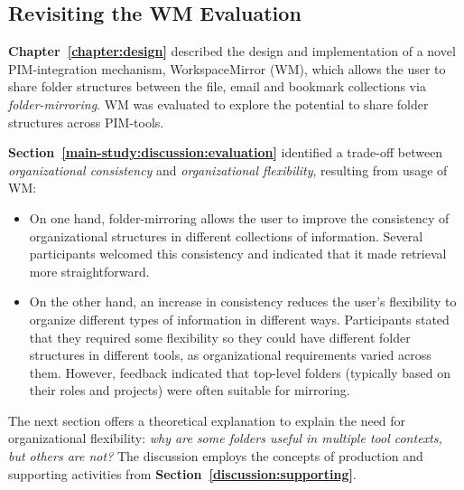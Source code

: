 \subsection{Revisiting the WM Evaluation}
\label{disc:design-guidelines-discussion-pim-integration}

\textbf{Chapter~\ref{chapter:design}} described the design and implementation of a novel PIM-integration mechanism, WorkspaceMirror (WM), which allows the user to share folder structures between the file, email and bookmark collections via \textit{folder-mirroring}. 
WM was evaluated to explore the potential to share folder structures across PIM-tools. 

\textbf{Section~\ref{main-study:discussion:evaluation}} identified a trade-off between \textit{organizational consistency} and \textit{organizational flexibility}, resulting from usage of WM:

\begin{itemize}

\item On one hand, folder-mirroring allows the user to improve the consistency of organizational structures in different collections of information.  Several participants welcomed this consistency and indicated that it made retrieval more straightforward.

\item On the other hand, an increase in consistency reduces the user's flexibility to organize different types of information in different ways.  Participants stated that they required some flexibility so they could have different folder structures in different tools, as organizational requirements varied across them.  However, feedback indicated that top-level folders (typically based on their roles and projects) were often suitable for mirroring.  

\end{itemize}

The next section offers a theoretical explanation to explain the need for organizational flexibility: \textit{why are some folders useful in multiple tool contexts, but others are not?}  The discussion employs the concepts of production and supporting activities from \textbf{Section~\ref{discussion:supporting}}. 






